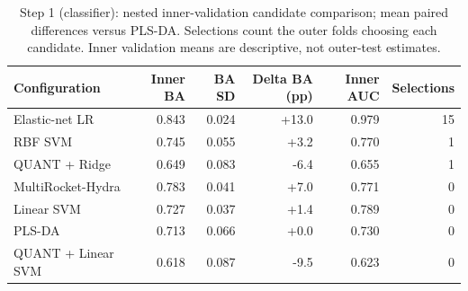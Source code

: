 \begin{table}[t]
\centering
\caption{Step 1 (classifier): nested inner-validation candidate comparison; mean paired differences versus PLS-DA. Selections count the outer folds choosing each candidate. Inner validation means are descriptive, not outer-test estimates.}
\label{tab:step1_candidates}
\footnotesize
\setlength{\tabcolsep}{4pt}
\begin{tabular}{lrrrrr}
\toprule
Configuration & Inner BA & BA SD & Delta BA (pp) & Inner AUC & Selections \\
\midrule
Elastic-net LR & 0.843 & 0.024 & +13.0 & 0.979 & 15 \\
RBF SVM & 0.745 & 0.055 & +3.2 & 0.770 & 1 \\
QUANT + Ridge & 0.649 & 0.083 & -6.4 & 0.655 & 1 \\
MultiRocket-Hydra & 0.783 & 0.041 & +7.0 & 0.771 & 0 \\
Linear SVM & 0.727 & 0.037 & +1.4 & 0.789 & 0 \\
PLS-DA & 0.713 & 0.066 & +0.0 & 0.730 & 0 \\
QUANT + Linear SVM & 0.618 & 0.087 & -9.5 & 0.623 & 0 \\
\bottomrule
\end{tabular}
\end{table}
